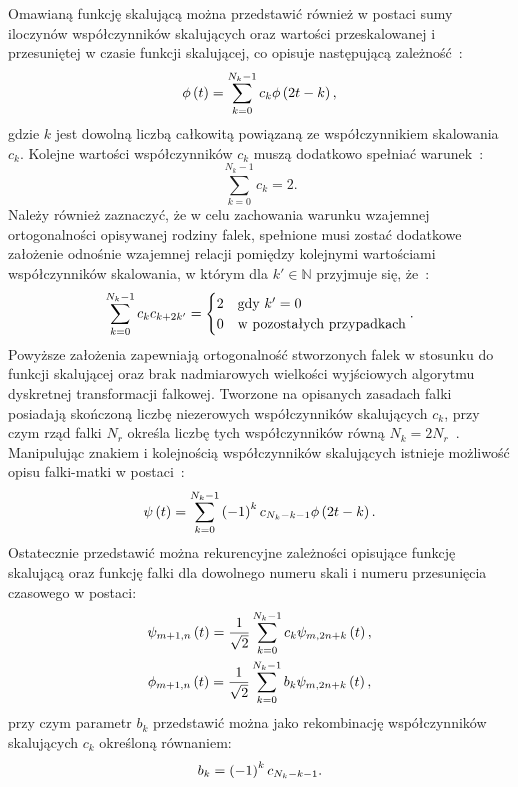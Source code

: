 Omawianą funkcję skalującą można przedstawić również w postaci sumy iloczynów współczynników skalujących oraz wartości przeskalowanej i przesuniętej w czasie funkcji skalującej, co opisuje następującą zależność~\cite{wallen_handbook}:
\begin{equation}
\phi \left(t\right) = \sum _{k=0} ^{N_k-1} c_{k} \phi \left( 2t - k \right) \label{eq:dwt_scalefunrek},
\end{equation}
gdzie $k$ jest dowolną liczbą całkowitą powiązaną ze współczynnikiem skalowania $c_k$. Kolejne wartości współczynników $c_k$ muszą dodatkowo spełniać warunek~\cite{wallen_handbook}:
\begin{equation}
\sum _{k=0} ^{N_k-1} c_{k} = 2 \label{eq:dwt_scalefunsum}.
\end{equation}
Należy również zaznaczyć, że w celu zachowania warunku wzajemnej ortogonalności opisywanej rodziny falek, spełnione musi zostać dodatkowe założenie odnośnie wzajemnej relacji pomiędzy kolejnymi wartościami współczynników skalowania, w którym dla $k' \in \mathbb{N}$ przyjmuje się, że~\cite{akujuobi_applications}:
\begin{equation}
\sum _{k=0} ^{N_k-1} c_{k} c_{k+2k'} =
\begin{cases}
	2 & $gdy$~k' = 0 \\
	0 & $w pozostałych przypadkach$
\end{cases}
\label{eq:dwt_scalemulort}.
\end{equation}
Powyższe założenia zapewniają ortogonalność stworzonych falek w stosunku do funkcji skalującej oraz brak nadmiarowych wielkości wyjściowych algorytmu dyskretnej transformacji falkowej. Tworzone na opisanych zasadach falki posiadają skończoną liczbę niezerowych współczynników skalujących $c_k$, przy czym rząd falki $N_r$ określa liczbę tych współczynników równą $N_{k} = 2 N_r$~\cite{lord_guide, shensa_dwt}. Manipulując znakiem i kolejnością współczynników skalujących istnieje możliwość opisu falki-matki w postaci~\cite{wallen_handbook}:
\begin{equation}
\psi \left(t\right) = \sum _{k=0} ^{N_k-1} \left(-1\right) ^{k} c_{N_k-k-1} \phi \left( 2t - k \right) \label{eq:dwt_waveletfunrek}.
\end{equation}
Ostatecznie przedstawić można rekurencyjne zależności opisujące funkcję skalującą oraz funkcję falki dla dowolnego numeru skali i numeru przesunięcia czasowego w postaci:
\begin{gather}
\psi_{m+1,n} \left(t\right) = \frac{1}{\sqrt{2}} \sum _{k=0} ^{N_k-1} c_{k} \psi_{m,2n+k} \left(t\right) \label{eq:dwt_fatherrek}, \\
\phi_{m+1,n} \left(t\right) = \frac{1}{\sqrt{2}} \sum _{k=0} ^{N_k-1} b_{k} \psi_{m,2n+k} \left(t\right) \label{eq:dwt_matherrek},
\end{gather}
przy czym parametr $b_{k}$ przedstawić można jako rekombinację współczynników skalujących $c_{k}$ określoną równaniem:
\begin{equation}
b_{k} = \left(-1\right) ^{k} c_{N_k-k-1} \label{eq:dwt_bk}.
\end{equation}

